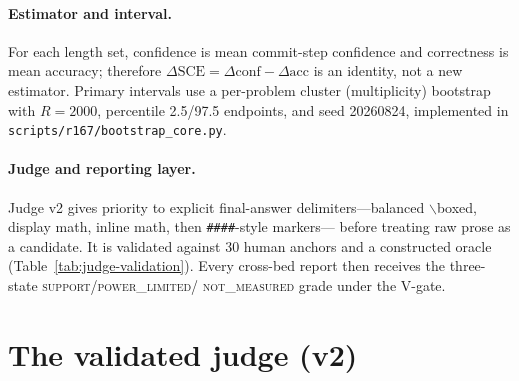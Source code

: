\documentclass{article}
\begin{document}
\paragraph{Estimator and interval.}
For each length set, confidence is mean commit-step confidence and correctness is
mean accuracy; therefore $\Delta\mathrm{SCE}=\Delta\mathrm{conf}-\Delta\mathrm{acc}$
is an identity, not a new estimator.  Primary intervals use a per-problem cluster
(multiplicity) bootstrap with $R=2000$, percentile 2.5/97.5 endpoints, and seed
20260824, implemented in \nolinkurl{scripts/r167/bootstrap_core.py}.

\paragraph{Judge and reporting layer.}
Judge v2 gives priority to explicit final-answer delimiters---balanced
$\backslash$boxed, display math, inline math, then \texttt{\#\#\#\#}-style markers---
before treating raw prose as a candidate.  It is validated against 30 human anchors
and a constructed oracle (Table~\ref{tab:judge-validation}).  Every cross-bed report
then receives the three-state \textsc{support}/\textsc{power\_limited}/%
\textsc{not\_measured} grade under the V-gate.

\section{The validated judge (v2)}
\label{sec:judge}
\end{document}
